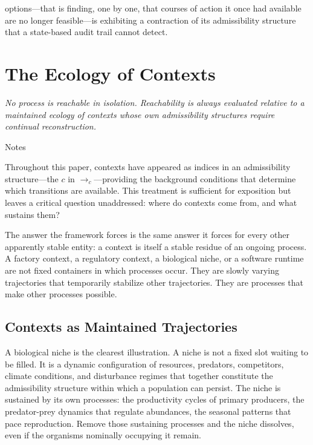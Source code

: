 \documentclass[12pt, a4paper]{article}
\theoremstyle{plain}
\theoremstyle{definition}
\theoremstyle{remark}
\begin{document}
options---that is finding, one by one, that courses of action it once had
available are no longer feasible---is exhibiting a contraction of its
admissibility structure that a state-based audit trail cannot detect.

\section{The Ecology of Contexts}
\label{sec:ecology}

\epigraph{\textit{No process is reachable in isolation. Reachability is
always evaluated relative to a maintained ecology of contexts whose own
admissibility structures require continual reconstruction.}}{Notes}

\noindent
Throughout this paper, contexts have appeared as indices in an admissibility
structure---the $c$ in $\to_c$---providing the background conditions that
determine which transitions are available. This treatment is sufficient for
exposition but leaves a critical question unaddressed: where do contexts
come from, and what sustains them?

The answer the framework forces is the same answer it forces for every other
apparently stable entity: a context is itself a stable residue of an ongoing
process. A factory context, a regulatory context, a biological niche, or a
software runtime are not fixed containers in which processes occur. They are
slowly varying trajectories that temporarily stabilize other trajectories.
They are processes that make other processes possible.

\subsection{Contexts as Maintained Trajectories}

A biological niche is the clearest illustration. A niche is not a fixed slot
waiting to be filled. It is a dynamic configuration of resources, predators,
competitors, climate conditions, and disturbance regimes that together
constitute the admissibility structure within which a population can persist.
The niche is sustained by its own processes: the productivity cycles of primary
producers, the predator-prey dynamics that regulate abundances, the seasonal
patterns that pace reproduction. Remove those sustaining processes and the
niche dissolves, even if the organisms nominally occupying it remain.
\end{document}
